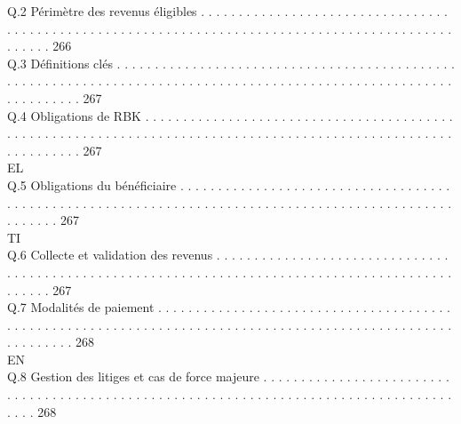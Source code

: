 \documentclass[12pt,landscape,a4paper]{article}
\begin{document}
Q.2     Périmètre des revenus éligibles . . . . . . . . . . . . . . . . . . . . . . . . . . . . . . . . . . . . . . . . . . . . . . . . . . . . . . . . . . . . . . . . . . . . . . . . . . . . . . . . . . . . . . . . . . . . . . . . . . 266\\
Q.3     Définitions clés . . . . . . . . . . . . . . . . . . . . . . . . . . . . . . . . . . . . . . . . . . . . . . . . . . . . . . . . . . . . . . . . . . . . . . . . . . . . . . . . . . . . . . . . . . . . . . . . . . . . . . . . . . . . . . . . . . 267\\
Q.4     Obligations de RBK . . . . . . . . . . . . . . . . . . . . . . . . . . . . . . . . . . . . . . . . . . . . . . . . . . . . . . . . . . . . . . . . . . . . . . . . . . . . . . . . . . . . . . . . . . . . . . . . . . . . . . . . . . . . . . 267\\
\vspace{0.5em}
\vspace{0.5em}
\vspace{0.5em}
\vspace{0.5em}
EL\\
Q.5     Obligations du bénéficiaire . . . . . . . . . . . . . . . . . . . . . . . . . . . . . . . . . . . . . . . . . . . . . . . . . . . . . . . . . . . . . . . . . . . . . . . . . . . . . . . . . . . . . . . . . . . . . . . . . . . . . . 267\\
\vspace{0.5em}
\vspace{0.5em}
\vspace{0.5em}
\vspace{0.5em}
TI\\
Q.6     Collecte et validation des revenus . . . . . . . . . . . . . . . . . . . . . . . . . . . . . . . . . . . . . . . . . . . . . . . . . . . . . . . . . . . . . . . . . . . . . . . . . . . . . . . . . . . . . . . . . . . . . . . . 267\\
Q.7     Modalités de paiement . . . . . . . . . . . . . . . . . . . . . . . . . . . . . . . . . . . . . . . . . . . . . . . . . . . . . . . . . . . . . . . . . . . . . . . . . . . . . . . . . . . . . . . . . . . . . . . . . . . . . . . . . . . 268\\
\vspace{0.5em}
\vspace{0.5em}
\vspace{0.5em}
\vspace{0.5em}
EN\\
Q.8     Gestion des litiges et cas de force majeure . . . . . . . . . . . . . . . . . . . . . . . . . . . . . . . . . . . . . . . . . . . . . . . . . . . . . . . . . . . . . . . . . . . . . . . . . . . . . . . . . . . . . . . . 268\\
\end{document}
